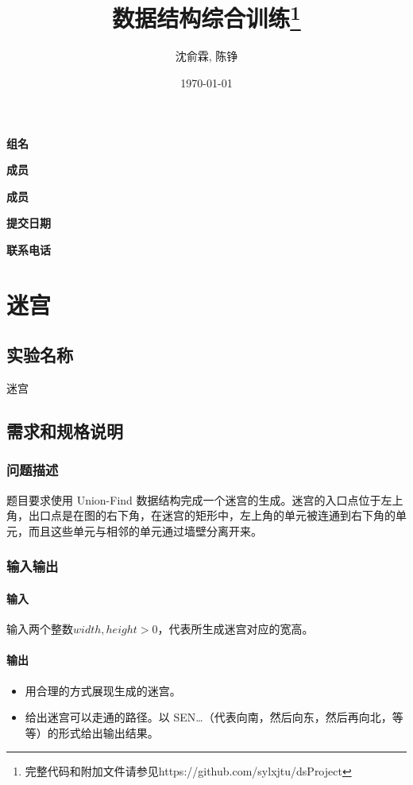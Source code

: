 \documentclass[UTF8]{ctexart}
\title{数据结构综合训练\footnote{完整代码和附加文件请参见https://github.com/sylxjtu/dsProject}}
\date{\today}
\author{沈俞霖, 陈铮}
\begin{document}
  \maketitle
  \vspace{80mm}
  \begin{flushright}

  \textbf{组名}     

  \textbf{成员}     


  \textbf{成员}     


  \textbf{提交日期} \makebox[7em][l]{\today}

  \textbf{联系电话} 

  \end{flushright}
  \newpage

  \tableofcontents
  \newpage

  \section{迷宫}
    \subsection{实验名称}
      迷宫
    \subsection{需求和规格说明}
      \subsubsection{问题描述}
        题目要求使用 Union-Find 数据结构完成一个迷宫的生成。迷宫的入口点位于左上角，出口点是在图的右下角，在迷宫的矩形中，左上角的单元被连通到右下角的单元，而且这些单元与相邻的单元通过墙壁分离开来。
      \subsubsection{输入输出}
        \paragraph{输入}
        输入两个整数$width, height > 0$，代表所生成迷宫对应的宽高。
        \paragraph{输出}
          \begin{itemize}
            \item 用合理的方式展现生成的迷宫。
            \item 给出迷宫可以走通的路径。以 SEN…（代表向南，然后向东，然后再向北，等等）的形式给出输出结果。
          \end{itemize}
\end{document}

